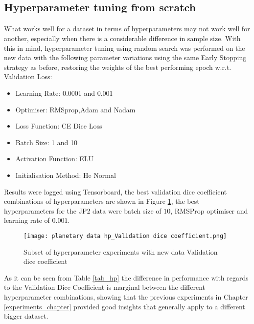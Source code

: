 \subsection{Hyperparameter tuning from scratch} \label{hp_new_data}
\paragraph{}
What works well for a dataset in terms of hyperparameters may not work well for another, especially when there is a considerable difference in sample size. With this in mind, hyperparameter tuning using random search was performed on the new data with the following parameter variations using the same Early Stopping strategy as before, restoring the weights of the best performing epoch \gls{w.r.t.} Validation Loss:
\begin{itemize}
    \item{Learning Rate: 0.0001 and 0.001}
    \item{Optimiser: RMSprop,Adam and Nadam}
    \item{Loss Function: CE Dice Loss}
    \item{Batch Size: 1 and 10}
    \item{Activation Function: ELU}
    \item{Initialisation Method: He Normal}
\end{itemize}

Results were logged using Tensorboard, the best validation dice coefficient combinations of hyperparameters are shown in Figure \ref{hp}, the best hyperparameters for the \gls{JP2} data were batch size of $10$, \gls{RMSProp} optimiser and learning rate of $0.001$.

\begin{figure}[hbt!]
    \centering
    \texttt{[image: planetary data hp\_Validation dice coefficient.png]}
    \caption{Subset of hyperparameter experiments with new data Validation dice coefficient}
    \label{hp}
\end{figure}
As it can be seen from Table \ref{tab_hp} the difference in performance with regards to the Validation Dice Coefficient is marginal between the different hyperparameter combinations, showing that the previous experiments in Chapter \ref{experiments_chapter} provided good insights that generally apply to a different bigger dataset.

